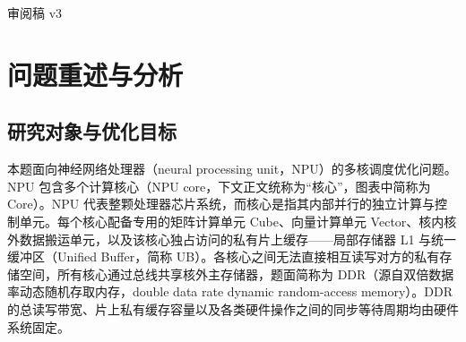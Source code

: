 \documentclass[anonymous,notoc]{gmcm2026}
\begin{document}
\maketitle
\begin{center}\small 审阅稿 v3\end{center}
\begin{abstract}
面向多核神经网络处理器的计算任务执行需求，本文研究数据流计算图的子图切分、核心分配与调度定序联合优化问题。在由算子与数据依赖构成的有向无环图中，方案需协同确定算子到子图的划分、子图到计算核心的指派以及各核心上的任务执行全序。针对赛题递进的硬件执行语义，本文构建了轻量结构构造与有限模拟闭环择优的求解体系。

针对问题一中子图物理隔离、跨任务数据必须通过外部主存中转的通信约束，算法分析前沿拓扑与并联支路，提出分支援助重分配机制；利用桥树分解将过载核心的独立计算分支剥离并迁移至轻载核心，证明了基于拓扑高度波次的重构能够消除循环等待、保证调度时序的拓扑可行性。针对问题二中同核子图合并、允许私有缓存跨子图复用数据的特性，算法构建超图模型刻画张量在多核心间的边界复制代价，并在二核心超图割中引入流水线工作量上限保护，防止算力向单一核心过度倾斜。针对问题三中引入各计算核心共享的只读缓存的架构演进，算法针对多分支树状归约结构，在不同子树之间不交错、逐棵完成且内部开销固定的受限模型下，证明了按子树存储峰值与最终保留量之差降序排列可使内部结果存储峰值达到最小；同时指明任意深度优先后序遍历并不必然最小化峰值，亦不等价于全局缓存复用或完成时间最优。

全套固定算法在官方全部 100 张计算图与 1 至 5 核的测试场景中完成系统评测，每题均获得 500 个完整合法的调度结果。在 5 核场景下，三类问题相对统一单核基线的官方口径平均加速比分别达到 4.0553、4.5498 与 4.7576。在问题三保持切分方案不变的成对测试中，启用只读缓存相比关闭缓存取得 1.0829 的平均加速比，平均字节命中率达 31.36\%。全流程测试中，三类问题全量 500 个测试网格的端到端平均求解耗时分别为 2.825 秒、4.029 秒与 4.401 秒。所测物理运行时间为共享主机环境下的工程耗时，底层执行时钟周期属于微架构离散事件仿真指标。
\end{abstract}
\section{问题重述与分析}

\subsection{研究对象与优化目标}

本题面向神经网络处理器（neural processing unit，NPU）的多核调度优化问题。NPU 包含多个计算核心（NPU core，下文正文统称为``核心''，图表中简称为 Core）。NPU 代表整颗处理器芯片系统，而核心是指其内部并行的独立计算与控制单元。每个核心配备专用的矩阵计算单元 Cube、向量计算单元 Vector、核内核外数据搬运单元，以及该核心独占访问的私有片上缓存------局部存储器 L1 与统一缓冲区（Unified Buffer，简称 UB）。各核心之间无法直接相互读写对方的私有存储空间，所有核心通过总线共享核外主存储器，题面简称为 DDR（源自双倍数据率动态随机存取内存，double data rate dynamic random-access memory）。DDR 的总读写带宽、片上私有缓存容量以及各类硬件操作之间的同步等待周期均由硬件系统固定。
\end{document}
